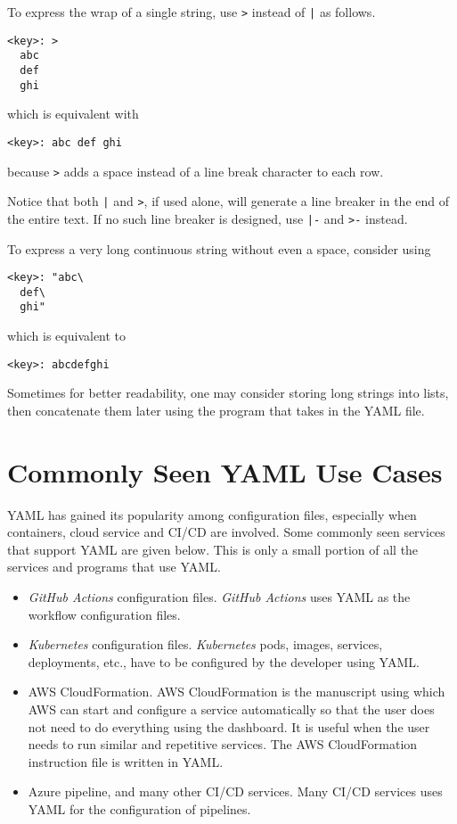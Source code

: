 To express the wrap of a single string, use \verb|>| instead of \texttt{|} as follows.
\begin{lstlisting}
<key>: >
  abc
  def
  ghi
\end{lstlisting}
which is equivalent with
\begin{lstlisting}
<key>: abc def ghi
\end{lstlisting}
because \verb|>| adds a space instead of a line break character to each row.

Notice that both \texttt{|} and \verb|>|, if used alone, will generate a line breaker in the end of the entire text. If no such line breaker is designed, use \texttt{|-} and \verb|>-| instead.

To express a very long continuous string without even a space, consider using
\begin{lstlisting}
<key>: "abc\
  def\
  ghi"
\end{lstlisting}
which is equivalent to
\begin{lstlisting}
<key>: abcdefghi
\end{lstlisting}
Sometimes for better readability, one may consider storing long strings into lists, then concatenate them later using the program that takes in the YAML file.

\section{Commonly Seen YAML Use Cases}

YAML has gained its popularity among configuration files, especially when containers, cloud service and CI/CD are involved. Some commonly seen services that support YAML are given below. This is only a small portion of all the services and programs that use YAML.

\begin{itemize}
	\item \textit{GitHub Actions} configuration files. \textit{GitHub Actions} uses YAML as the workflow configuration files.
	\item \textit{Kubernetes} configuration files. \textit{Kubernetes} pods, images, services, deployments, etc., have to be configured by the developer using YAML.
	\item AWS CloudFormation. AWS CloudFormation is the manuscript using which AWS can start and configure a service automatically so that the user does not need to do everything using the dashboard. It is useful when the user needs to run similar and repetitive services. The AWS CloudFormation instruction file is written in YAML.
	\item Azure pipeline, and many other CI/CD services. Many CI/CD services uses YAML for the configuration of pipelines.
\end{itemize}
